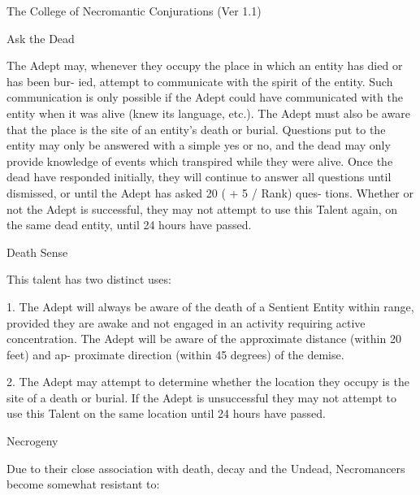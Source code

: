 \begin{Chapter}{The College of Necromantic Conjurations (Ver 1.1)}
\begin{talent}[T-1]{Ask the Dead }
\begin{effects}
The Adept may, whenever they occupy the 
place in which an entity has died or has been bur-
ied,  attempt  to  communicate  with  the  spirit  of  the 
entity.  Such  communication  is  only  possible  if  the 
Adept  could  have  communicated  with  the  entity 
when  it  was  alive  (knew  its  language,  etc.).  The 
Adept must also be aware that the place is the site 
of an entity’s death or burial. Questions put to the 
entity  may  only  be  answered  with  a  simple  yes  or 
no,  and  the  dead  may  only  provide  knowledge  of 
events  which  transpired  while  they  were  alive. 
Once  the  dead  have  responded  initially,  they  will 
continue to answer all questions until dismissed, or 
until  the  Adept  has  asked  20  (  +  5  /  Rank)  ques-
tions. Whether or not the Adept is successful, they 
may  not  attempt  to  use  this  Talent  again,  on  the 
same dead entity, until 24 hours have passed. 

\end{effects}
\end{talent}

\begin{talent}[T-2]{Death Sense }

\begin{effects}
This talent has two distinct uses: 

1. The Adept will always be aware of the death of a 
Sentient  Entity  within  range,  provided  they  are 
awake  and  not  engaged  in  an  activity  requiring 
active  concentration.  The  Adept  will  be  aware  of 
the  approximate  distance  (within  20  feet)  and  ap-
proximate  direction  (within  45  degrees)  of  the 
demise. 

2.  The  Adept  may  attempt  to  determine  whether 
the  location  they  occupy  is  the  site  of  a  death  or 
burial.  If  the  Adept  is  unsuccessful  they  may  not 
attempt  to  use  this  Talent  on  the  same  location 
until 24 hours have passed. 

\end{effects}
\end{talent}

\begin{talent}[T-3]{Necrogeny }

\begin{effects}
 Due  to  their  close  association  with  death, 
decay  and  the  Undead,  Necromancers  become 
somewhat resistant to: 


\end{effects}
\end{talent}
\end{Chapter}

